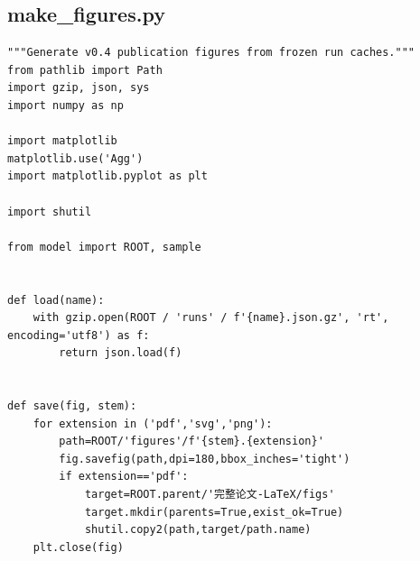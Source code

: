 \subsection{make\_figures.py}
\begin{verbatim}
"""Generate v0.4 publication figures from frozen run caches."""
from pathlib import Path
import gzip, json, sys
import numpy as np

import matplotlib
matplotlib.use('Agg')
import matplotlib.pyplot as plt

import shutil

from model import ROOT, sample


def load(name):
    with gzip.open(ROOT / 'runs' / f'{name}.json.gz', 'rt', encoding='utf8') as f:
        return json.load(f)


def save(fig, stem):
    for extension in ('pdf','svg','png'):
        path=ROOT/'figures'/f'{stem}.{extension}'
        fig.savefig(path,dpi=180,bbox_inches='tight')
        if extension=='pdf':
            target=ROOT.parent/'完整论文-LaTeX/figs'
            target.mkdir(parents=True,exist_ok=True)
            shutil.copy2(path,target/path.name)
    plt.close(fig)



\end{verbatim}
